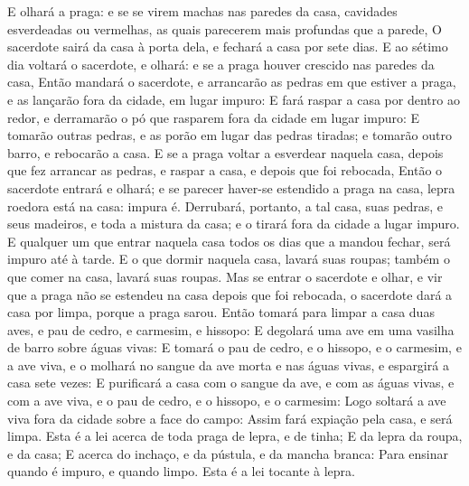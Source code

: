 {E olhará a praga: e se se virem machas nas paredes da casa, cavidades esverdeadas ou vermelhas, as quais parecerem mais profundas que a parede,
O sacerdote sairá da casa à porta dela, e fechará a casa por sete dias.
E ao sétimo dia voltará o sacerdote, e olhará: e se a praga houver crescido nas paredes da casa,
Então mandará o sacerdote, e arrancarão as pedras em que estiver a praga, e as lançarão fora da cidade, em lugar impuro:
E fará raspar a casa por dentro ao redor, e derramarão o pó que rasparem fora da cidade em lugar impuro:
E tomarão outras pedras, e as porão em lugar das pedras tiradas; e tomarão outro barro, e rebocarão a casa.
E se a praga voltar a esverdear naquela casa, depois que fez arrancar as pedras, e raspar a casa, e depois que foi rebocada,
Então o sacerdote entrará e olhará; e se parecer haver-se estendido a praga na casa, lepra roedora está na casa: impura é.
Derrubará, portanto, a tal casa, suas pedras, e seus madeiros, e toda a mistura da casa; e o tirará fora da cidade a lugar impuro.
E qualquer um que entrar naquela casa todos os dias que a mandou fechar, será impuro até à tarde.
E o que dormir naquela casa, lavará suas roupas; também o que comer na casa, lavará suas roupas.
Mas se entrar o sacerdote e olhar, e vir que a praga não se estendeu na casa depois que foi rebocada, o sacerdote dará a casa por limpa, porque a praga sarou.
Então tomará para limpar a casa duas aves, e pau de cedro, e carmesim, e hissopo:
E degolará uma ave em uma vasilha de barro sobre águas vivas:
E tomará o pau de cedro, e o hissopo, e o carmesim, e a ave viva, e o molhará no sangue da ave morta e nas águas vivas, e espargirá a casa sete vezes:
E purificará a casa com o sangue da ave, e com as águas vivas, e com a ave viva, e o pau de cedro, e o hissopo, e o carmesim:
Logo soltará a ave viva fora da cidade sobre a face do campo: Assim fará expiação pela casa, e será limpa.
Esta é a lei acerca de toda praga de lepra, e de tinha;
E da lepra da roupa, e da casa;
E acerca do inchaço, e da pústula, e da mancha branca:
Para ensinar quando é impuro, e quando limpo. Esta é a lei tocante à lepra.

}
